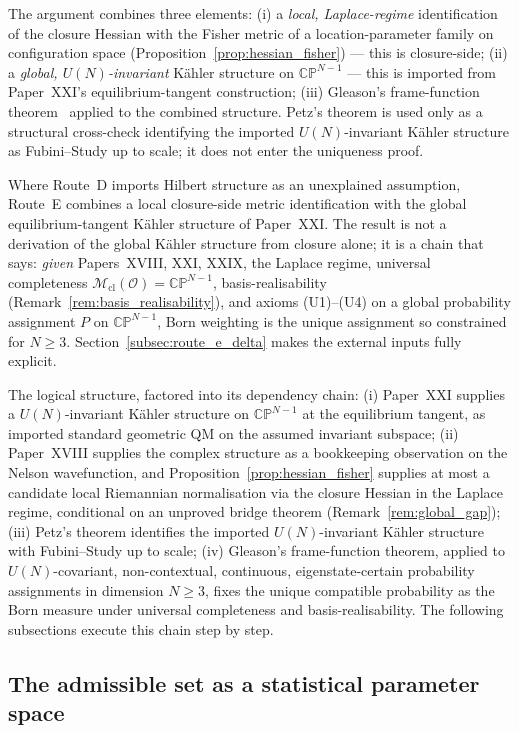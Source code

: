 \documentclass[12pt]{article}
\newcommand{\Ocal}{\mathcal{O}}
\newcommand{\Mcl}{\mathcal{M}_{\mathrm{cl}}}
\begin{document}
The argument combines three elements: (i) a \emph{local, Laplace-regime} identification of the closure Hessian with the Fisher metric of a location-parameter family on configuration space (Proposition~\ref{prop:hessian_fisher}) --- this is closure-side; (ii) a \emph{global, $U(N)$-invariant} K\"ahler structure on $\mathbb{CP}^{N-1}$ --- this is imported from Paper~XXI's equilibrium-tangent construction; (iii) Gleason's frame-function theorem~\citep{Gleason1957,Peres1995,CookKeaneMoran1985} applied to the combined structure. Petz's theorem is used only as a structural cross-check identifying the imported $U(N)$-invariant K\"ahler structure as Fubini--Study up to scale; it does not enter the uniqueness proof.

Where Route~D imports Hilbert structure as an unexplained assumption, Route~E combines a local closure-side metric identification with the global equilibrium-tangent K\"ahler structure of Paper~XXI. The result is not a derivation of the global K\"ahler structure from closure alone; it is a chain that says: \emph{given} Papers~XVIII, XXI, XXIX, the Laplace regime, universal completeness $\Mcl(\Ocal) = \mathbb{CP}^{N-1}$, basis-realisability (Remark~\ref{rem:basis_realisability}), and axioms (U1)--(U4) on a global probability assignment $P$ on $\mathbb{CP}^{N-1}$, Born weighting is the unique assignment so constrained for $N \geq 3$. Section~\ref{subsec:route_e_delta} makes the external inputs fully explicit.

The logical structure, factored into its dependency chain: (i) Paper~XXI supplies a $U(N)$-invariant K\"ahler structure on $\mathbb{CP}^{N-1}$ at the equilibrium tangent, as imported standard geometric QM on the assumed invariant subspace; (ii) Paper~XVIII supplies the complex structure as a bookkeeping observation on the Nelson wavefunction, and Proposition~\ref{prop:hessian_fisher} supplies at most a candidate local Riemannian normalisation via the closure Hessian in the Laplace regime, conditional on an unproved bridge theorem (Remark~\ref{rem:global_gap}); (iii) Petz's theorem identifies the imported $U(N)$-invariant K\"ahler structure with Fubini--Study up to scale; (iv) Gleason's frame-function theorem, applied to $U(N)$-covariant, non-contextual, continuous, eigenstate-certain probability assignments in dimension $N \geq 3$, fixes the unique compatible probability as the Born measure under universal completeness and basis-realisability. The following subsections execute this chain step by step.

\subsection{The admissible set as a statistical parameter space}\label{subsec:stat_manifold}
\end{document}
